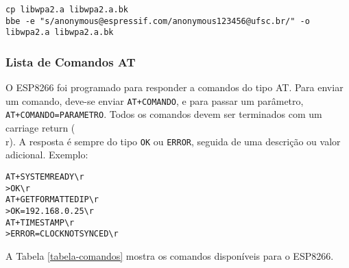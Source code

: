 \documentclass[11pt]{article}
\begin{document}
\begin{lstlisting}
cp libwpa2.a libwpa2.a.bk
bbe -e "s/anonymous@espressif.com/anonymous123456@ufsc.br/" -o libwpa2.a libwpa2.a.bk
\end{lstlisting}

\subsubsection{Lista de Comandos AT}

O ESP8266 foi programado para responder a comandos do tipo AT. Para enviar um comando, deve-se enviar \texttt{AT+COMANDO}, e para passar um parâmetro, \texttt{AT+COMANDO=PARAMETRO}. Todos os comandos devem ser terminados com um carriage return (\\r). A resposta é sempre do tipo \texttt{OK} ou \texttt{ERROR}, seguida de uma descrição ou valor adicional. Exemplo:

\begin{verbatim}
AT+SYSTEMREADY\r
>OK\r
AT+GETFORMATTEDIP\r
>OK=192.168.0.25\r
AT+TIMESTAMP\r
>ERROR=CLOCKNOTSYNCED\r
\end{verbatim}

A Tabela \ref{tabela-comandos} mostra os comandos disponíveis para o ESP8266.
\end{document}
